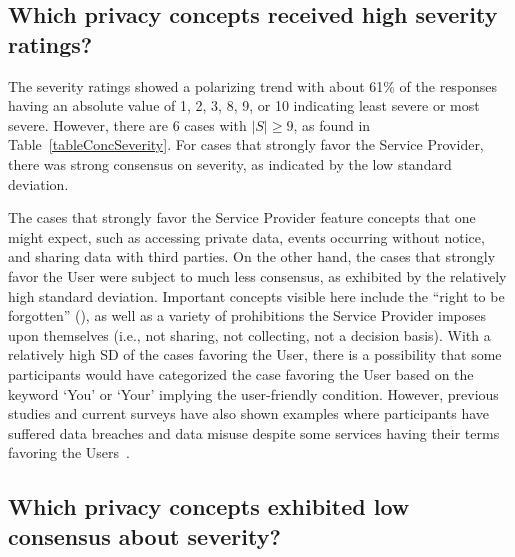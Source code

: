 {%
\subsection{Which privacy concepts received high severity ratings?}
\label{sec:highSeverity}




The severity ratings showed a polarizing trend with about 61\% of the responses having an absolute value of 1, 2, 3, 8, 9, or 10 indicating least severe or most severe.
However, there are 6 cases with $|S| \geq 9$, as found in Table~\ref{tableConcSeverity}. 
For cases that strongly favor the Service Provider, there was strong consensus on severity, as indicated by the low standard deviation.


The cases that strongly favor the Service Provider feature concepts that one might expect, such as accessing private data, events occurring without notice, and sharing data with third parties.
On the other hand, the cases that strongly favor the User were subject to much less consensus, as exhibited by the relatively high standard deviation.
Important concepts visible here include the ``right to be forgotten'' (), as well as a variety of prohibitions the Service Provider imposes upon themselves (i.e., not sharing, not collecting, not a decision basis). With a relatively high SD of the cases favoring the User, there is a possibility that some participants would have categorized the case favoring the User based on the keyword `You' or `Your' implying the user-friendly condition.
However, previous studies and current surveys have also shown examples where participants have suffered data breaches and data misuse despite some services having their terms favoring the Users~\cite{thomas2017data}.
} %

\subsection{Which privacy concepts exhibited low consensus about severity?}

